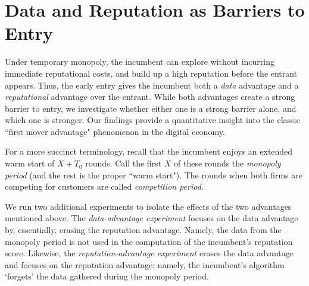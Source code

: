 \documentclass[../competing_bandits.tex]{subfiles}
\begin{document}
\section{Data and Reputation as Barriers to Entry}\label{section:6}

Under temporary monopoly, the incumbent can explore without incurring immediate reputational costs, and build up a high reputation before the entrant appears. Thus, the early entry gives the incumbent both a \textit{data} advantage and a \textit{reputational} advantage over the entrant. While both advantages create a strong barrier to entry, we investigate whether either one is a strong barrier alone, and which one is stronger. Our findings provide a quantitative insight into the classic ``first mover advantage" phenomenon in the digital economy.

For a more succinct terminology, recall that the incumbent enjoys an extended warm start of $X+T_0$ rounds. Call the first $X$ of these rounds the \emph{monopoly period} (and the rest is the proper ``warm start"). The rounds when both firms are competing for customers are called \emph{competition period.}

We run two additional experiments to isolate the effects of the two
advantages mentioned above. The \emph{data-advantage experiment} focuses on the data advantage by, essentially, erasing the reputation advantage. Namely, the data from the monopoly period is not used in the computation of the incumbent's reputation score. Likewise, the \emph{reputation-advantage experiment} erases the data advantage and focuses on the reputation advantage: namely, the incumbent's algorithm `forgets' the data gathered during the monopoly period.
\end{document}
